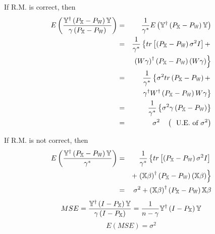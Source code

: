 \documentclass{article}
\begin{document}
\bigskip

If R.M. is correct, then%
\begin{eqnarray*}
E\left( \frac{\mathbb{Y}^{\dagger }\left( P_{\mathbb{X}}-P_{\mathbb{W}%
}\right) \mathbb{Y}}{\mathbb{\gamma }\left( P_{\mathbb{X}}-P_{\mathbb{W}%
}\right) }\right) &=&\frac{1}{\gamma ^{\ast }}E\left( \mathbb{Y}^{\dagger
}\left( P_{\mathbb{X}}-P_{\mathbb{W}}\right) \mathbb{Y}\right) \\
&=&\frac{1}{\gamma ^{\ast }}\left\{ tr\left[ \left( P_{\mathbb{X}}-P_{%
\mathbb{W}}\right) \sigma ^{2}I\right] +\right. \\
&&\left. \left( W\gamma \right) ^{\dagger }\left( P_{\mathbb{X}}-P_{\mathbb{W%
}}\right) \left( W\gamma \right) \right\} \\
&=&\frac{1}{\gamma ^{\ast }}\left\{ \sigma ^{2}tr\left( P_{\mathbb{X}}-P_{%
\mathbb{W}}\right) +\right. \\
&&\left. \gamma ^{\dagger }W^{\dagger }\left( P_{\mathbb{X}}-P_{\mathbb{W}%
}\right) W\gamma \right\} \\
&=&\frac{1}{\gamma ^{\ast }}\left\{ \sigma ^{2}\gamma \left( P_{\mathbb{X}%
}-P_{\mathbb{W}}\right) \right\} \\
&=&\sigma ^{2}\quad \left( \text{U.E. of }\sigma ^{2}\right)
\end{eqnarray*}

\bigskip

If R.M. is not correct, then%
\begin{eqnarray*}
E\left( \frac{\mathbb{Y}^{\dagger }\left( P_{\mathbb{X}}-P_{\mathbb{W}%
}\right) \mathbb{Y}}{\mathbb{\gamma }^{\ast }}\right) &=&\frac{1}{\gamma
^{\ast }}\left\{ tr\left[ \left( P_{\mathbb{X}}-P_{\mathbb{W}}\right) \sigma
^{2}I\right] \right. \\
&&+\left. \left( \mathbb{X}\beta \right) ^{\dagger }\left( P_{\mathbb{X}}-P_{%
\mathbb{W}}\right) \left( \mathbb{X}\beta \right) \right\} \\
&=&\sigma ^{2}+\left( \mathbb{X}\beta \right) ^{\dagger }\left( P_{\mathbb{X}%
}-P_{\mathbb{W}}\right) \mathbb{X}\beta
\end{eqnarray*}%
\begin{equation*}
MSE=\frac{\mathbb{Y}^{\dagger }\left( I-P_{\mathbb{X}}\right) \mathbb{Y}}{%
\mathbb{\gamma }\left( I-P_{\mathbb{X}}\right) }=\frac{1}{n-\gamma }\mathbb{Y%
}^{\dagger }\left( I-P_{\mathbb{X}}\right) \mathbb{Y}
\end{equation*}%
\begin{equation*}
E\left( MSE\right) =\sigma ^{2}
\end{equation*}
\end{document}
